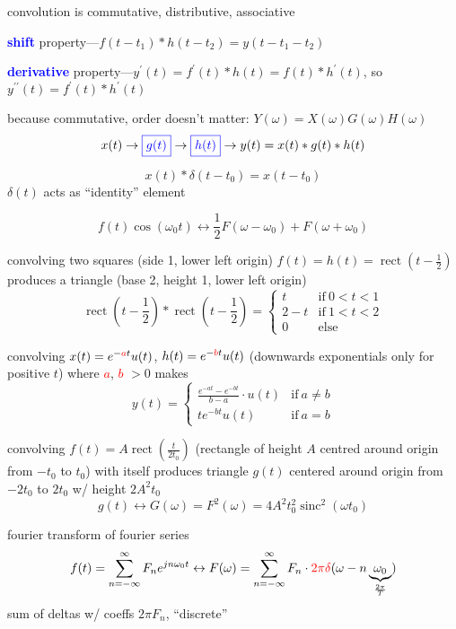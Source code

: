\documentclass[a5paper, fleqn]{article}
\newcommand{\vocab}[1]{\textbf{\textcolor{blue}{#1}}}
\newcommand{\emf}[1]{\textcolor{red}{#1}}
\newcommand{\eq}[1]{\textcolor{red}{$#1$}}
\newcommand{\wrap}{\hangpara{0.5cm}{1}}
\DeclareMathOperator{\sinc}{sinc}
\DeclareMathOperator{\rect}{rect}
\begin{document}
convolution is commutative, distributive, associative

\vocab{shift} property---$f(t - t_1) * h(t - t_2) = y(t - t_1 - t_2)$

\vocab{derivative} property---$y^\prime(t) = f^\prime(t) * h(t) = f(t) * h^\prime(t)$, so $y^{\prime\prime}(t) = f^\prime(t) * h^\prime(t)$

because commutative, order doesn't matter: $Y(\omega) = X(\omega) G(\omega) H(\omega)$
\[x(t) \to \textcolor{blue}{\boxed{g(t)}} \to \textcolor{blue}{\boxed{h(t)}} \to y(t) = x(t) * g(t) * h(t)\]

\[x(t) * \delta(t - t_0) = x(t - t_0)\]
$\delta(t)$ acts as ``identity'' element

\[f(t) \cos(\omega_0 t) \leftrightarrow \frac{1}{2} F(\omega - \omega_0) + F(\omega + \omega_0)\]

\wrap convolving two squares (side 1, lower left origin) $f(t) = h(t) = \rect\left(t - \frac{1}{2}\right)$ produces a triangle (base 2, height 1, lower left origin) \[\rect\left(t - \frac{1}{2}\right) * \rect\left(t - \frac{1}{2}\right) = \begin{cases}
    t     & \text{if} ~ 0 < t < 1 \\
    2 - t & \text{if} ~ 1 < t < 2 \\
    0     & \text{else}
  \end{cases}\]

\wrap convolving $x(t) = e^{-\emf{a}t} u(t)$, $h(t) = e^{-\emf{b}t} u(t)$ (downwards exponentials only for positive $t$) where \eq{a}, \eq{b} $> 0$ makes
\[y(t) = \begin{cases}
    \frac{e^{-at} - e^{-bt}}{b - a} \cdot u(t) & \text{if}~ a \neq b \\
    te^{-bt} u(t)                              & \text{if}~ a = b
  \end{cases}\]

\wrap convolving $f(t) = A \rect\left(\frac{t}{2t_0}\right)$ (rectangle of height $A$ centred around origin from $-t_0$ to $t_0$) with itself produces triangle $g(t)$ centered around origin from $-2t_0$ to $2t_0$ w/ height $2A^2t_0$
\[g(t) \leftrightarrow G(\omega) = F^2(\omega) = 4A^2t_0^2 \sinc^2(\omega t_0)\]

fourier transform of fourier series
\[f(t) = \sum_{n = -\infty}^\infty F_n e^{jn\omega_0 t} \leftrightarrow F(\omega) = \sum_{n = -\infty}^\infty F_n \cdot \emf{2\pi \delta}(\omega - n\underbrace{\omega_0}_{\frac{2\pi}{T}})\]
sum of deltas w/ coeffs $2\pi F_n$, ``discrete''
\end{document}
